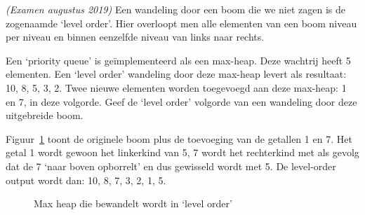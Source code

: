 \begin{oef}
\papier \emph{(Examen augustus 2019)} Een wandeling door een boom die we niet zagen is de zogenaamde ‘level order’. Hier overloopt men alle elementen van een boom niveau per niveau en binnen eenzelfde niveau van links naar rechts.

Een ‘priority queue’ is geïmplementeerd als een max-heap. Deze wachtrij heeft 5 elementen. Een ‘level order’ wandeling door deze max-heap levert als resultaat: 10, 8, 5, 3, 2. Twee nieuwe elementen worden toegevoegd aan deze max-heap: 1 en 7, in deze volgorde. Geef de ‘level order’ volgorde van een wandeling door deze uitgebreide boom.
\begin{opl}
Figuur~\ref{fig:levelorderheap} toont de originele boom plus de toevoeging van de getallen 1 en 7. Het getal 1 wordt gewoon het linkerkind van 5, 7 wordt het rechterkind met als gevolg dat de 7 ‘naar boven opborrelt’ en dus gewisseld wordt met 5. De level-order output wordt dan: 10, 8, 7, 3, 2, 1, 5.
\begin{figure}[htbp]
    \centering
{}
\caption{Max heap die bewandelt wordt in ‘level order’}
\label{fig:levelorderheap}
\end{figure}
\end{opl}
\end{oef}


